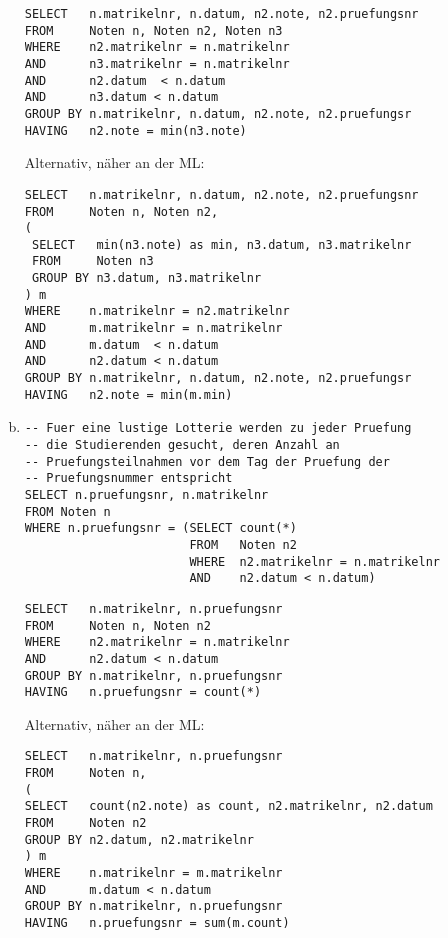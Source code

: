 \begin{normalText}
\begin{enumerate}[a)]
\cprotEnv
\begin{note}
\begin{lstlisting}
SELECT   n.matrikelnr, n.datum, n2.note, n2.pruefungsnr
FROM     Noten n, Noten n2, Noten n3
WHERE    n2.matrikelnr = n.matrikelnr
AND      n3.matrikelnr = n.matrikelnr
AND      n2.datum  < n.datum
AND      n3.datum < n.datum
GROUP BY n.matrikelnr, n.datum, n2.note, n2.pruefungsr
HAVING   n2.note = min(n3.note)
\end{lstlisting}

Alternativ, näher an der ML:

\begin{lstlisting}
SELECT   n.matrikelnr, n.datum, n2.note, n2.pruefungsnr
FROM     Noten n, Noten n2,
(
 SELECT   min(n3.note) as min, n3.datum, n3.matrikelnr
 FROM     Noten n3
 GROUP BY n3.datum, n3.matrikelnr
) m
WHERE    n.matrikelnr = n2.matrikelnr
AND      m.matrikelnr = n.matrikelnr
AND      m.datum  < n.datum
AND      n2.datum < n.datum
GROUP BY n.matrikelnr, n.datum, n2.note, n2.pruefungsr
HAVING   n2.note = min(m.min)
\end{lstlisting}
\end{note}

\item

\begin{lstlisting}
-- Fuer eine lustige Lotterie werden zu jeder Pruefung
-- die Studierenden gesucht, deren Anzahl an
-- Pruefungsteilnahmen vor dem Tag der Pruefung der
-- Pruefungsnummer entspricht
SELECT n.pruefungsnr, n.matrikelnr
FROM Noten n
WHERE n.pruefungsnr = (SELECT count(*)
                       FROM   Noten n2
                       WHERE  n2.matrikelnr = n.matrikelnr
                       AND    n2.datum < n.datum)
\end{lstlisting}

\cprotEnv
\begin{note}
\begin{lstlisting}
SELECT   n.matrikelnr, n.pruefungsnr
FROM     Noten n, Noten n2
WHERE    n2.matrikelnr = n.matrikelnr
AND      n2.datum < n.datum
GROUP BY n.matrikelnr, n.pruefungsnr
HAVING   n.pruefungsnr = count(*)
\end{lstlisting}

Alternativ, näher an der ML:

\begin{lstlisting}
SELECT   n.matrikelnr, n.pruefungsnr
FROM     Noten n,
(
SELECT   count(n2.note) as count, n2.matrikelnr, n2.datum
FROM     Noten n2
GROUP BY n2.datum, n2.matrikelnr
) m
WHERE    n.matrikelnr = m.matrikelnr
AND      m.datum < n.datum
GROUP BY n.matrikelnr, n.pruefungsnr
HAVING   n.pruefungsnr = sum(m.count)
\end{lstlisting}
\end{note}

\end{enumerate}
\end{normalText}
